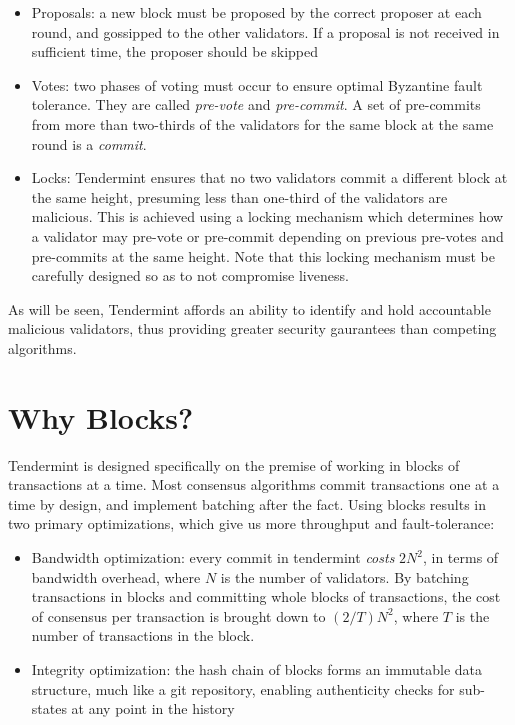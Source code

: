 \begin{itemize}

\item{Proposals: a new block must be proposed by the correct proposer at each round, and gossipped to the other validators. If a proposal is not received in sufficient time, the proposer should be skipped}

\item{Votes: two phases of voting must occur to ensure optimal Byzantine fault tolerance. They are called \emph{pre-vote} and \emph{pre-commit}. A set of pre-commits from more than two-thirds of the validators for the same block at the same round is a \emph{commit}.}

\item{Locks: Tendermint ensures that no two validators commit a different block at the same height, presuming less than one-third of the validators are malicious. This is achieved using a locking mechanism which determines how a validator may pre-vote or pre-commit depending on previous pre-votes and pre-commits at the same height. Note that this locking mechanism must be carefully designed so as to not compromise liveness.}

\end{itemize}

As will be seen, Tendermint affords an ability to identify and hold accountable malicious validators, thus providing greater security gaurantees than competing algorithms.

\section{Why Blocks?}

Tendermint is designed specifically on the premise of working in blocks of transactions at a time. 
Most consensus algorithms commit transactions one at a time by design, and implement batching after the fact.
Using blocks results in two primary optimizations, which give us more throughput and fault-tolerance:

\begin{itemize}
\item{Bandwidth optimization: every commit in tendermint \emph{costs} $2N^2$, 
	in terms of bandwidth overhead, where $N$ is the number of validators. 
	By batching transactions in blocks and committing whole blocks of transactions, 
	the cost of consensus per transaction is brought down to $(2/T)N^2$, where $T$ is the number of transactions in the block.}
\item{Integrity optimization: the hash chain of blocks forms an immutable data structure, much like a git repository, enabling authenticity checks for sub-states at any point in the history}
\end{itemize}

